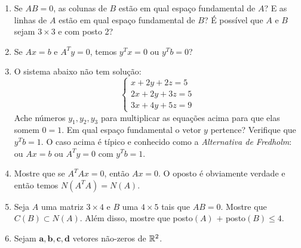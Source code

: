 \documentclass[leqno]{article}
\begin{document}
\begin{enumerate}

\item Se $AB = 0$, as colunas de $B$ estão em qual espaço fundamental de $A$? E as linhas de $A$ estão em qual espaço fundamental de $B$? É possível que $A$ e $B$ sejam $3 \times 3$ e com posto 2?

\begin{sol} 
\end{sol} 

\item Se $Ax = b$ e $A^Ty = 0$, temos $y^Tx = 0$ ou $y^Tb=0$?

\begin{sol} 
\end{sol} 

\item O sistema abaixo não tem solução:
$$\begin{cases}
x + 2y + 2z = 5\\
2x + 2y + 3z = 5\\
3x + 4y + 5z = 9
\end{cases}$$
Ache números $y_1,y_2,y_3$ para multiplicar as equações acima para que elas somem $0=1$. Em qual espaço fundamental o vetor $y$ pertence? Verifique que $y^Tb = 1$. O caso acima é típico e conhecido como a \textit{Alternativa de Fredholm}: ou $Ax = b$ ou $A^Ty = 0$ com $y^Tb = 1$.

\begin{sol} 
\end{sol} 

\item Mostre que se $A^TAx = 0$, então $Ax = 0$. O oposto é obviamente verdade e então temos $N(A^TA) = N(A)$.

\begin{sol} 
\end{sol} 

\item Seja $A$ uma matriz $3 \times 4$ e $B$ uma $4 \times 5$ tais que $AB = 0$. Mostre que $C(B) \subset N(A)$. Além disso, mostre que posto$(A)$ $ + $ posto$(B) \leq 4$.

\begin{sol} 
\end{sol} 

\item Sejam $\mathbf{a,b,c,d}$ vetores não-zeros de $\mathbb{R}^2$.


\end{enumerate}
\end{document}
